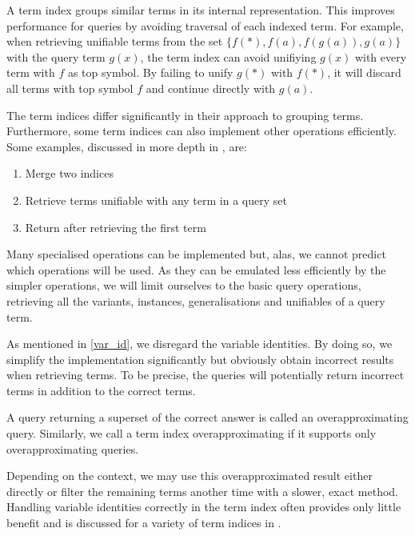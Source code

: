 A term index groups similar terms in its internal representation. This improves performance for queries by avoiding traversal of each indexed term. For example, when retrieving unifiable terms from the set $\{f(*), f(a), f(g(a)), g(a)\}$ with the query term $g(x)$, the term index can avoid unifiying $g(x)$ with every term with $f$ as top symbol. By failing to unify $g(*)$ with $f(*)$, it will discard all terms with top symbol $f$ and continue directly with $g(a)$.

The term indices differ significantly in their approach to grouping terms. Furthermore, some term indices can also implement other operations efficiently. Some examples, discussed in more depth in \cite{carbonell_comparison_1995}, are:

\begin{enumerate}
  \item Merge two indices
  \item Retrieve terms unifiable with any term in a query set
  \item Return after retrieving the first term 
\end{enumerate}

Many specialised operations can be implemented but, alas, we cannot predict which operations will be used. As they can be emulated less efficiently by the simpler operations, we will limit ourselves to the basic query operations, retrieving all the variants, instances, generalisations and unifiables of a query term.

As mentioned in \cref{var_id}, we disregard the variable identities. By doing so, we simplify the implementation significantly but obviously obtain incorrect results when retrieving terms. To be precise, the queries will potentially return incorrect terms in addition to the correct terms.

\begin{defn}
  A query returning a superset of the correct answer is called an overapproximating query. Similarly, we call a term index overapproximating if it supports only overapproximating queries.
\end{defn}

Depending on the context, we may use this overapproximated result either directly or filter the remaining terms another time with a slower, exact method. Handling variable identities correctly in the term index often provides only little benefit and is discussed for a variety of term indices in \cite{carbonell_comparison_1995}.
